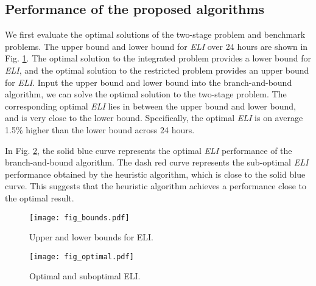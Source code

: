 \documentclass[journal]{IEEEtran}
\begin{document}
	\subsection{Performance of the proposed algorithms}
	We first evaluate the optimal solutions of the two-stage problem and benchmark problems. The upper bound and lower bound for \emph{ELI} over 24 hours are shown in Fig. \ref{fig_bounds}. The optimal solution to the integrated problem provides a lower bound for \emph{ELI}, and the optimal solution to the restricted problem provides an upper bound for \emph{ELI}. Input the upper bound and lower bound into the branch-and-bound algorithm, we can solve the optimal solution to the two-stage problem. The corresponding optimal \emph{ELI} lies in between the upper bound and lower bound, and is very close to the lower bound. Specifically, the optimal \emph{ELI} is on average 1.5\% higher than the lower bound across 24 hours.
	
	In Fig. \ref{fig_optimal}, the solid blue curve represents the optimal \emph{ELI} performance of the branch-and-bound algorithm. The dash red curve represents the sub-optimal \emph{ELI} performance obtained by the heuristic algorithm, which is close to the solid blue curve. This suggests that the heuristic algorithm achieves a performance close to the optimal result. 
	\begin{figure}[tbhp]
		\vspace{-4mm}
		\centering
		\texttt{[image: fig\_bounds.pdf]}
		\caption{\label{fig_bounds}Upper and lower bounds for ELI.}
		\vspace{-2mm}
	\end{figure}
	\begin{figure}[tbhp]
		\vspace{-4mm}
		\centering
		\texttt{[image: fig\_optimal.pdf]}
		\caption{\label{fig_optimal}Optimal and suboptimal ELI.}
		\vspace{-4mm}
	\end{figure}
	
	
\end{document}
